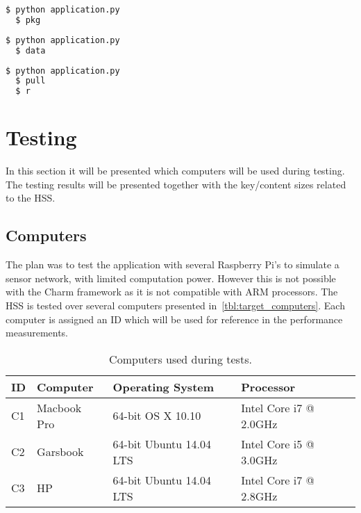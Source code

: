 \begin{lstlisting}[language=bash, caption={Start PKG}, label={lst:pkg}]
  $ python application.py
  $ pkg
\end{lstlisting}

\begin{lstlisting}[language=bash, caption={Start a device registering a prefix.}, label={lst:data}]
  $ python application.py
  $ data
\end{lstlisting}

\begin{lstlisting}[language=bash, caption={Start a device that will express \gls{interest} in \gls{data}.}, label={lst:pull}]
  $ python application.py
  $ pull
  $ r
\end{lstlisting}

\section{Testing}
In this section it will be presented which computers will be used during testing. 
The testing results will be presented together with the key/content sizes related to the \gls{HSS}.

\subsection{Computers}
The plan was to test the application with several Raspberry Pi's to simulate a sensor network, with limited computation power.
However this is not possible with the Charm framework as it is not compatible with ARM processors.
The \gls{HSS} is tested over several computers presented in~\autoref{tbl:target_computers}.
Each computer is assigned an ID which will be used for reference in the performance measurements.

\begin{table}[h]
  \begin{tabular}{llll}
  ID      & Computer                  & Operating System          & Processor                    \\ \hline
  C1      & Macbook Pro               & 64-bit OS X 10.10         & Intel Core i7 @ 2.0GHz       \\ %
  C2      & Garsbook                  & 64-bit Ubuntu 14.04 LTS   & Intel Core i5 @ 3.0GHz       \\ %
  C3      & HP                        & 64-bit Ubuntu 14.04 LTS   & Intel Core i7 @ 2.8GHz       \\ %
  \end{tabular}
  \caption[Test computers]{Computers used during tests.}
  \label{tbl:target_computers}
\end{table}

